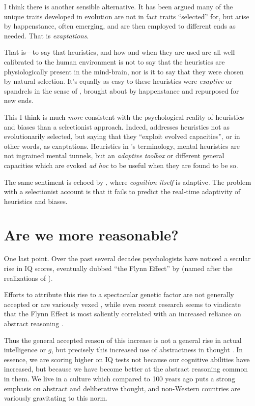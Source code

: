 \documentclass{article}
\begin{document}
I think there is another sensible alternative.
It has been argued \parencite{massimo89,gould91} many of the unique traits developed in evolution are not in fact traits ``selected'' for, but arise by happenstance, often emerging, and are then employed to different ends as needed.
That is \textit{exaptations}.

That is---to say that heuristics, and how and when they are used are all well calibrated to the human environment is not to say that the heuristics are physiologically present in the mind-brain, nor is it to say that they were chosen by natural selection.
It's equally as easy to these heuristics were \emph{exaptive} \parencite{buss98} or spandrels in the sense of \textcite{gould79}, brought about by happenstance and repurposed for new ends.

This I think is much \emph{more} consistent with the psychological reality of heuristics and biases than a selectionist approach.
Indeed, \textcite{gigerenzer08} addresses heuristics not as evolutionarily selected, but saying that they ``exploit evolved capacities'', or in other words, as exaptations.
Heuristics in \textcite{gigerenzer08}'s terminology, mental heuristics are not ingrained mental tunnels, but an \emph{adaptive toolbox} or different general capacities which are evoked \emph{ad hoc} to be useful when they are found to be so.

The same sentiment is echoed by \textcite{anderson90}, where \emph{cognition itself} is adaptive.
The problem with a selectionist account is that it fails to predict the real-time adaptivity of heuristics and biases.

\section{Are we more reasonable?}

One last point.
Over the past several decades psychologists have noticed a secular rise in IQ scores, eventually dubbed ``the Flynn Effect'' by \textcite{herrnstein94} (named after the realizations of \textcite{flynn87}).

Efforts to attribute this rise to a spectacular genetic factor are not generally accepted or are variously vexed \parencite{woodley11}, while even recent research seems to vindicate that the Flynn Effect is most saliently correlated with an increased reliance on abstract reasoning \parencite{must16}.

Thus the general accepted reason of this increase is not a general rise in actual intelligence or $g$, but precisely this increased use of abstractness in thought \parencite{flynn07}.
In essence, we are scoring higher on IQ tests not because our cognitive abilities have increased, but because we have become better at the abstract reasoning common in them.
We live in a culture which compared to 100 years ago puts a strong emphasis on abstract and deliberative thought, and non-Western countries are variously gravitating to this norm.
\end{document}
